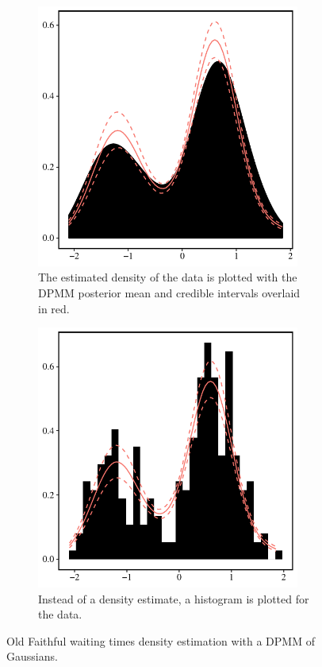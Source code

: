 \documentclass[nojss]{jss}
\begin{document}
\begin{figure}[tb]
\centering
  \begin{subfigure}[t]{0.45\textwidth}
	  \includegraphics[width=0.95\textwidth]{img/old_faithful_density_plot.pdf}
	  \caption{The estimated density of the data is plotted with the DPMM posterior mean and credible intervals overlaid in red. }
	  \label{fig:oldfaithfuldens}
	\end{subfigure} \hfill
	\begin{subfigure}[t]{0.45\textwidth}
	  \includegraphics[width=0.95\textwidth]{img/old_faithful_hist_plot.pdf}
	  \caption{Instead of a density estimate, a histogram is plotted for the data.}
	  \label{fig:oldfaithfulhist}
	\end{subfigure}
  \caption{Old Faithful waiting times density estimation with a DPMM of Gaussians.}
  \label{fig:oldfaithful}
\end{figure}
\end{document}
